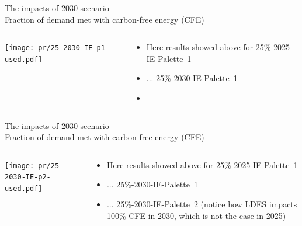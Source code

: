 \begin{frame}{The impacts of 2030 scenario \\ 
Fraction of demand met with carbon-free energy (CFE) }

\begin{columns}[T]
\begin{column}{9cm}
\centering

\texttt{[image: pr/25-2030-IE-p1-used.pdf]}
\end{column}
\begin{column}{5cm}

  \begin{itemize}
  \item Here results showed above for 25\%-\alert{2025}-IE-Palette~1
  \item ... 25\%-\alert{2030}-IE-Palette~1
  \item 
  \end{itemize}
  
\end{column}
\end{columns}

\end{frame}


\begin{frame}{The impacts of 2030 scenario  \\ 
Fraction of demand met with carbon-free energy (CFE) }

\begin{columns}[T]
\begin{column}{9cm}
\centering

\texttt{[image: pr/25-2030-IE-p2-used.pdf]}
\end{column}
\begin{column}{5cm}

  \begin{itemize}
  \item Here results showed above for 25\%-\alert{2025}-IE-Palette~1
  \item ... 25\%-\alert{2030}-IE-Palette~1
  \item ... 25\%-\alert{2030}-IE-Palette~2 (notice how LDES impacts 100\% CFE in 2030, which is not the case in 2025)
  \end{itemize}
  
\end{column}
\end{columns}

\end{frame}


